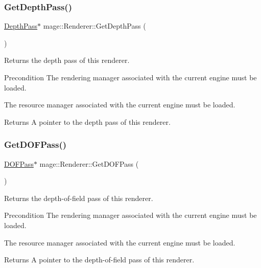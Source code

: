 \subsubsection{\texorpdfstring{Get\+Depth\+Pass()}{GetDepthPass()}}
{\footnotesize\ttfamily \hyperlink{classmage_1_1_depth_pass}{Depth\+Pass}$\ast$ mage\+::\+Renderer\+::\+Get\+Depth\+Pass (\begin{DoxyParamCaption}{ }\end{DoxyParamCaption})}

Returns the depth pass of this renderer.

\begin{DoxyPrecond}{Precondition}
The rendering manager associated with the current engine must be loaded. 

The resource manager associated with the current engine must be loaded. 
\end{DoxyPrecond}
\begin{DoxyReturn}{Returns}
A pointer to the depth pass of this renderer. 
\end{DoxyReturn}
\hypertarget{classmage_1_1_renderer_aecc4a5b2b6978ca03796f078c3936423}{}\label{classmage_1_1_renderer_aecc4a5b2b6978ca03796f078c3936423} 
\subsubsection{\texorpdfstring{Get\+D\+O\+F\+Pass()}{GetDOFPass()}}
{\footnotesize\ttfamily \hyperlink{classmage_1_1_d_o_f_pass}{D\+O\+F\+Pass}$\ast$ mage\+::\+Renderer\+::\+Get\+D\+O\+F\+Pass (\begin{DoxyParamCaption}{ }\end{DoxyParamCaption})}

Returns the depth-\/of-\/field pass of this renderer.

\begin{DoxyPrecond}{Precondition}
The rendering manager associated with the current engine must be loaded. 

The resource manager associated with the current engine must be loaded. 
\end{DoxyPrecond}
\begin{DoxyReturn}{Returns}
A pointer to the depth-\/of-\/field pass of this renderer. 
\end{DoxyReturn}
\hypertarget{classmage_1_1_renderer_a65fbd3dddaf1bff3fc9f53e00c38bb62}{}\label{classmage_1_1_renderer_a65fbd3dddaf1bff3fc9f53e00c38bb62} 
